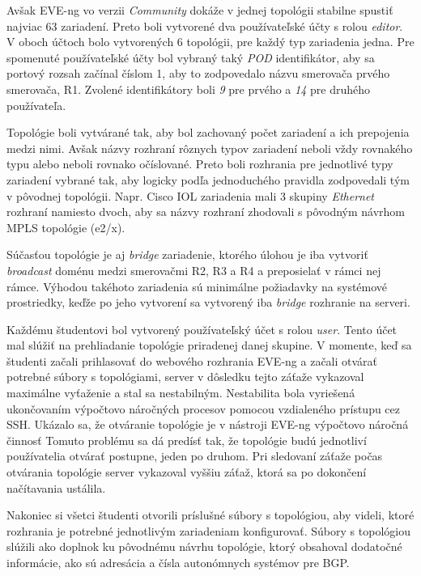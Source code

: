 Avšak EVE-ng vo verzii \emph{Community} dokáže v jednej topológii stabilne spustiť najviac 63 zariadení. Preto boli vytvorené dva používateľské účty s rolou \emph{editor}. V oboch účtoch bolo vytvorených 6 topológii, pre každý typ zariadenia jedna. Pre spomenuté používateľské účty bol vybraný taký \emph{POD} identifikátor, aby sa portový rozsah začínal číslom 1, aby to zodpovedalo názvu smerovača prvého smerovača, R1. Zvolené identifikátory boli \emph{9} pre prvého a \emph{14} pre druhého používateľa.

Topológie boli vytvárané tak, aby bol zachovaný počet zariadení a ich prepojenia medzi nimi. Avšak názvy rozhraní rôznych typov zariadení neboli vždy rovnakého typu alebo neboli rovnako očíslované. Preto boli rozhrania pre jednotlivé typy zariadení vybrané tak, aby logicky podľa jednoduchého pravidla zodpovedali tým v pôvodnej topológii. Napr. Cisco IOL zariadenia mali 3 skupiny \emph{Ethernet} rozhraní namiesto dvoch, aby sa názvy rozhraní zhodovali s pôvodným návrhom MPLS topológie (e2/x).

Súčasťou topológie je aj \emph{bridge} zariadenie, ktorého úlohou je iba vytvoriť \emph{broadcast} doménu medzi smerovačmi R2, R3 a R4 a preposielať v rámci nej rámce. Výhodou takéhoto zariadenia sú minimálne požiadavky na systémové prostriedky, keďže po jeho vytvorení sa vytvorený iba \emph{bridge} rozhranie na serveri.

Každému študentovi bol vytvorený používateľský účet s rolou \emph{user}. Tento účet mal slúžiť na prehliadanie topológie priradenej danej skupine. V momente, keď sa študenti začali prihlasovať do webového rozhrania EVE-ng a začali otvárať potrebné súbory s topológiami, server v dôsledku tejto záťaže vykazoval maximálne vyťaženie a stal sa nestabilným. Nestabilita bola vyriešená ukončovaním výpočtovo náročných procesov pomocou vzdialeného prístupu cez SSH. Ukázalo sa, že otváranie topológie je v nástroji EVE-ng výpočtovo náročná činnosť Tomuto problému sa dá predísť tak, že topológie budú jednotliví používatelia otvárať postupne, jeden po druhom. Pri sledovaní záťaže počas otvárania topológie server vykazoval vyššiu záťaž, ktorá sa po dokončení načítavania ustálila.

Nakoniec si všetci študenti otvorili príslušné súbory s topológiou, aby videli, ktoré rozhrania je potrebné jednotlivým zariadeniam konfigurovať. Súbory s topológiou slúžili ako doplnok ku pôvodnému návrhu topológie, ktorý obsahoval dodatočné informácie, ako sú adresácia a čísla autonómnych systémov pre BGP.

